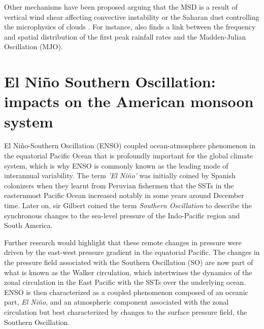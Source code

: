 Other mechanisms have been proposed arguing that the MSD is a result of vertical wind shear affecting convective instability or the Saharan dust controlling  the microphysics of clouds \citep{angeles2010origins}.
For instance, \cite{perdigon2019} also finds a link between the frequency and spatial distribution of the first peak rainfall rates and the Madden-Julian Oscillation (MJO). 
 
\section{El Niño Southern Oscillation: impacts on the American monsoon system}
\label{sub:lit_enso}



 El Niño-Southern Oscillation (ENSO) coupled ocean-atmosphere phenomenon in the equatorial Pacific Ocean that is profoundly important for the global climate system, which is why ENSO is commonly known as the leading mode of interannual variability. 
 The term \textit{'El Niño'} was initially coined by Spanish colonizers when they learnt from Peruvian fishermen that the SSTs in the easternmost Pacific Ocean increased notably in some years around December time. 
 Later on, sir Gilbert \cite{walker1924} coined the term \textit{Southern Oscillation} to describe the synchronous changes to the sea-level pressure of the Indo-Pacific region and South America. 
 
 
 
  
  Further research \citep[e.g.][]{troup1965} would highlight that these remote changes in pressure were driven by the east-west pressure gradient in the equatorial Pacific. 
    The changes in the pressure field associated with the Southern Oscillation (SO) are now part of what is known as the Walker circulation, which intertwines the dynamics of the zonal circulation in the East Pacific with the SSTs over the underlying ocean. ENSO is then characterized as a coupled phenomenon composed of an oceanic part, \textit{El Niño}, and an atmospheric component associated with the zonal circulation but best characterized by changes to the surface pressure field, the Southern Oscillation. 
  
